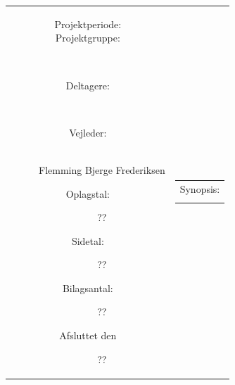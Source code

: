 \begin{titlingpage}
\begin{nopagebreak}
{\begin{tabular}{cc}
{\parbox{8cm}{
\begin{description}
\item[Projektperiode:]
  \hspace{1cm}
\item[Projektgruppe:] \\
\hspace{1cm}
\item[Deltagere:] \mbox{} \\[3mm]
   \hspace{1cm}
\item[Vejleder:] \mbox{} \\[3mm]
Flemming Bjerge Frederiksen \\
\end{description}
}
\begin{description}
\item[Oplagstal:] ??
\item[Sidetal:] ??
\item[Bilagsantal:] ??
\item[Afsluttet den] ??
\end{description}
 \vfill } &
 \parbox{7cm}{
 \vspace{0.7cm}
 \hfill
   \begin{tabular}{l}
  \textsf{Synopsis:}\bigskip \\
   \fbox{
     \parbox{6.5cm}{\bigskip {\vfill \small }}
\bigskip
}
    \end{tabular}
}
 \end{tabular}
 \\ \\ \\ \\ \\ \\
}
\end{nopagebreak}
\end{titlingpage}
